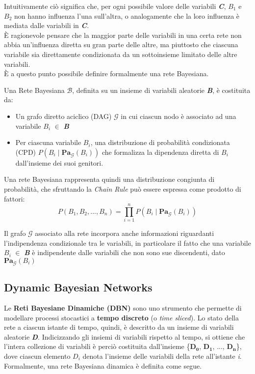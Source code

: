   Intuitivamente ciò significa che, per ogni possibile valore delle variabili \textit{\textbf{C}},
  \textit{$B_1$} e \textit{$B_2$} non hanno influenza l'una sull'altra,
  o analogamente che la loro influenza è mediata dalle variabili in \textit{\textbf{C}}.\\
  È ragionevole pensare che la maggior parte delle variabili in una certa rete non abbia un'influenza
  diretta su gran parte delle altre, ma piuttosto che ciascuna variabile sia direttamente condizionata 
  da un sottoinsieme limitato delle altre variabili.\\
  È a questo punto possibile definire formalmente una rete Bayesiana.

  \begin{definition} \cite{bn}
    Una Rete Bayesiana $\mathcal{B}$, definita su un insieme di variabili aleatorie \textit{\textbf{B}},
    è costituita da:
    \begin{itemize}
      \item Un grafo diretto aciclico (DAG) $\mathcal{G}$ in cui ciascun nodo è associato
        ad una variabile \textit{$B_i$} $\in$ \textit{\textbf{B}}
      \item Per ciascuna variabile \textit{$B_i$}, una distribuzione di probabilità condizionata (CPD) 
        $P(B_i \; | \; \mathbf{Pa}_{\mathcal{G}}(B_i))$ che formalizza la dipendenza diretta di \textit{$B_i$}
        dall'insieme dei suoi genitori.
    \end{itemize}
  \end{definition}

  Una rete Bayesiana rappresenta quindi una distribuzione congiunta di probabilità,
  che sfruttando la \textit{Chain Rule} può essere espressa come prodotto di fattori:
  \begin{equation}
    P(B_1, B_2, ..., B_n) = \prod_{i=1}^{n} P(B_i \; | \; \mathbf{Pa}_{\mathcal{G}}(B_i))  
  \end{equation}

  Il grafo $\mathcal{G}$ associato alla rete incorpora anche informazioni riguardanti l'indipendenza
  condizionale tra le variabili, in particolare il fatto che una variabile \textit{$B_i$} $\in$ \textit{\textbf{B}}
  è indipendente dalle variabili che non sono sue discendenti, dato $\mathbf{Pa}_{\mathcal{G}}(B_i)$

  \subsection{Dynamic Bayesian Networks}
  Le \textbf{Reti Bayesiane Dinamiche (DBN)} sono uno strumento che permette di modellare
  processi stocastici a \textbf{tempo discreto} (o \textit{time sliced}).
  Lo stato della rete a ciascun istante di tempo, quindi, è descritto da un insieme
  di variabili aleatorie \textit{\textbf{D}}. 
  Indicizzando gli insiemi di variabili rispetto al tempo, si ottiene che l'intera collezione di variabili è 
  perciò costituita dall'insieme \{$\bm{D_0}$, $\bm{D_1}$, ..., $\bm{D_n}$\},
  dove ciascun elemento $D_i$ denota l'insieme delle variabili della rete all'istante \textit{i}.\\
  Formalmente, una rete Bayesiana dinamica è definita come segue.

